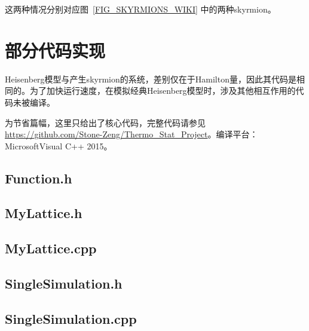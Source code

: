 \documentclass{article}
\begin{document}
		这两种情况分别对应图~\ref{FIG_SKYRMIONS_WIKI} 中的两种skyrmion。
		
	\section{部分代码实现}
		Heisenberg模型与产生skyrmion的系统，差别仅在于Hamilton量，因此其代码是相同的。为了加快运行速度，在模拟经典Heisenberg模型时，涉及其他相互作用的代码未被编译。
		
		为节省篇幅，这里只给出了核心代码，完整代码请参见 \url{https://github.com/Stone-Zeng/Thermo_Stat_Project}。编译平台：Microsoft\textregistered\;Visual C++ 2015。
		{
		\linespread{1}
%		
		\subsection{Function.h}
		
		\subsection{MyLattice.h}
		
		\subsection{MyLattice.cpp}
		
%		
%		
		\subsection{SingleSimulation.h}
		
		\subsection{SingleSimulation.cpp}
		
%		
%		
		}
		
\end{document}

